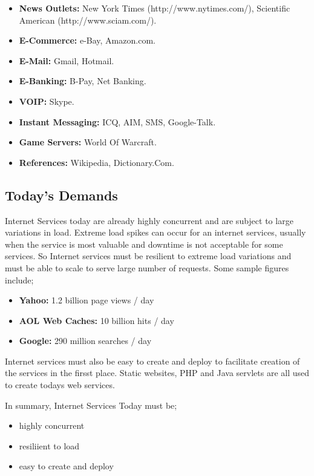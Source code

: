 \documentclass[a4paper]{article}
\begin{document}
\begin{itemize}
	\item \textbf{News Outlets:} New York Times (http://www.nytimes.com/), Scientific American (http://www.sciam.com/).
	\item \textbf{E-Commerce:} e-Bay, Amazon.com.
	\item \textbf{E-Mail:} Gmail, Hotmail. 
	\item \textbf{E-Banking:} B-Pay, Net Banking.
	\item \textbf{VOIP:} Skype.
	\item \textbf{Instant Messaging:} ICQ, AIM, SMS, Google-Talk.
	\item \textbf{Game Servers:} World Of Warcraft.
	\item \textbf{References:} Wikipedia, Dictionary.Com.
\end{itemize}

\subsection{Today's Demands}

Internet Services today are already highly concurrent and are subject to large variations in load. Extreme load spikes can occur for an internet services, usually when the service is most valuable and downtime is not acceptable for some services. So Internet services must be resilient to extreme load variations and must be able to scale to serve large number of requests. Some sample figures include;

\begin{itemize}
	\item \textbf{Yahoo:} 1.2 billion page views / day
	\item \textbf{AOL Web Caches:} 10 billion hits / day
	\item \textbf{Google:} 290 million searches / day
\end{itemize}

Internet services must also be easy to create and deploy to facilitate creation of the services in the firsst place. Static websites, PHP and Java servlets are all used to create todays web services.

In summary, Internet Services Today must be;

\begin{itemize}
	\item highly concurrent
	\item resiliient to load
	\item easy to create and deploy
\end{itemize}
\end{document}
